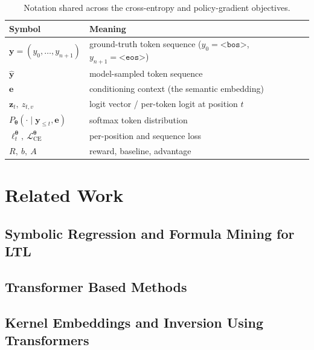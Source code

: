 \documentclass[titlepage,a4paper,11pt]{report}
\begin{document}
        \begin{table}[ht]
            \centering
            \caption{Notation shared across the cross-entropy and policy-gradient objectives.}
            \label{tab:prelim_notation}
            \begin{tabular}{ll}
                \toprule
                Symbol & Meaning \\
                \midrule
                $\bm y = (y_0,\dots,y_{n+1})$ & ground-truth token sequence ($y_0=\texttt{<bos>}$, $y_{n+1}=\texttt{<eos>}$) \\
                $\hat{\bm y}$                 & model-sampled token sequence \\
                $\bm e$                       & conditioning context (the semantic embedding) \\
                $\bm z_t,\ z_{t,v}$           & logit vector / per-token logit at position $t$ \\
                $P_{\bm\theta}(\cdot\mid\bm y_{\le t},\bm e)$ & softmax token distribution \\
                $\ell_t^{\bm\theta},\ \mathcal{L}_{\text{CE}}^{\bm\theta}$ & per-position and sequence loss \\
                $R,\ b,\ A$                   & reward, baseline, advantage \\
                \bottomrule
            \end{tabular}
        \end{table}
    

\chapter{Related Work}
    \section{Symbolic Regression and Formula Mining for LTL}
    
    \section{Transformer Based Methods}
    
    \section{Kernel Embeddings and Inversion Using Transformers}\label{sec:Kernel_Embeddings_and_Inversion}
    
\end{document}
